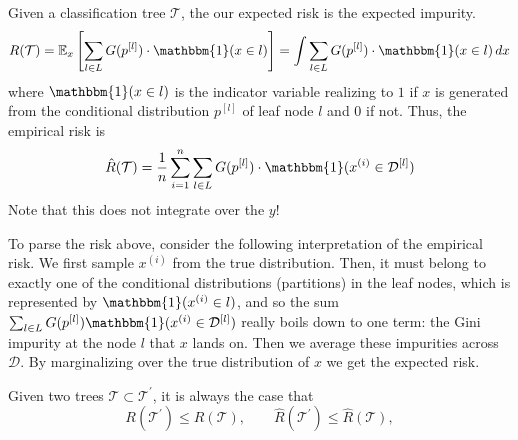   \begin{theorem}
    Given a classification tree $\mathcal{T}$, the our expected risk is the expected impurity. 
    \begin{equation}
      R(\mathcal{T}) = \mathbb{E}_{x} \left[ \sum_{l \in L} G(p^{[l]}) \cdot \mathbbm{1}(x \in l) \right] = \int \sum_{l \in L} G(p^{[l]}) \cdot \mathbbm{1}(x \in l) \,dx
    \end{equation}
    where $\mathbbm{1}(x \in l)$ is the indicator variable realizing to $1$ if $x$ is generated from the conditional distribution $p^{[l]}$ of leaf node $l$ and $0$ if not. Thus, the empirical risk is 
    \begin{equation}
      \hat{R}(\mathcal{T}) = \frac{1}{n} \sum_{i=1}^n \sum_{l \in L}G(p^{[l]}) \cdot \mathbbm{1}(x^{(i)} \in \mathcal{D}^{[l]})
    \end{equation}
    Note that this does not integrate over the $y$!
  \end{theorem}

  To parse the risk above, consider the following interpretation of the empirical risk. We first sample $x^{(i)}$ from the true distribution. Then, it must belong to exactly one of the conditional distributions (partitions) in the leaf nodes, which is represented by $\mathbbm{1}(x^{(i)} \in l)$, and so the sum $\sum_{l \in L} G(p^{[l]}) \mathbbm{1}(x^{(i)} \in \mathcal{D}^{[l]})$ really boils down to one term: the Gini impurity at the node $l$ that $x$ lands on. Then we average these impurities across $\mathcal{D}$. By marginalizing over the true distribution of $x$ we get the expected risk. 

  \begin{theorem}
    Given two trees $\mathcal{T} \subset \mathcal{T}^\prime$, it is always the case that 
    \begin{equation}
      R(\mathcal{T}^\prime) \leq R(\mathcal{T}), \qquad \hat{R}(\mathcal{T}^\prime) \leq \hat{R}(\mathcal{T}), 
    \end{equation}
  \end{theorem}

